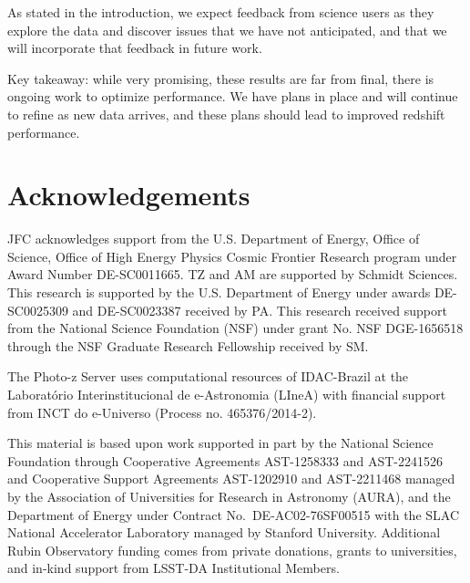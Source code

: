 As stated in the introduction, we expect feedback from science users as they explore the data and discover issues that we have not anticipated, and that we will incorporate that feedback in future work.

Key takeaway: while very promising, these results are far from final, there is ongoing work to optimize \photoz performance.  We have plans in place and will continue to refine as new data arrives, and these plans should lead to improved redshift performance. 

\pagebreak

\section{Acknowledgements}

JFC acknowledges support from the U.S. Department of Energy, Office of Science, Office of High Energy Physics Cosmic Frontier Research program under Award Number DE-SC0011665. 
TZ and AM are supported by Schmidt Sciences. 
This research is supported by the U.S. Department of Energy under awards DE-SC0025309 and DE-SC0023387 received by PA. 
This research received support from the National Science Foundation (NSF) under grant No. NSF DGE-1656518 through the NSF Graduate Research Fellowship received by SM. 

The Photo-z Server uses computational resources of IDAC-Brazil at the Laboratório Interinstitucional de e-Astronomia (LIneA) with financial support from INCT do e-Universo (Process no. 465376/2014-2).

This material is based upon work supported in part by the National Science Foundation through Cooperative Agreements AST-1258333 and AST-2241526 and Cooperative Support Agreements AST-1202910 and AST-2211468 managed by the Association of Universities for Research in Astronomy (AURA), and the Department of Energy under Contract No.\ DE-AC02-76SF00515 with the SLAC National Accelerator Laboratory managed by Stanford University.
Additional Rubin Observatory funding comes from private donations, grants to universities, and in-kind support from LSST-DA Institutional Members.




